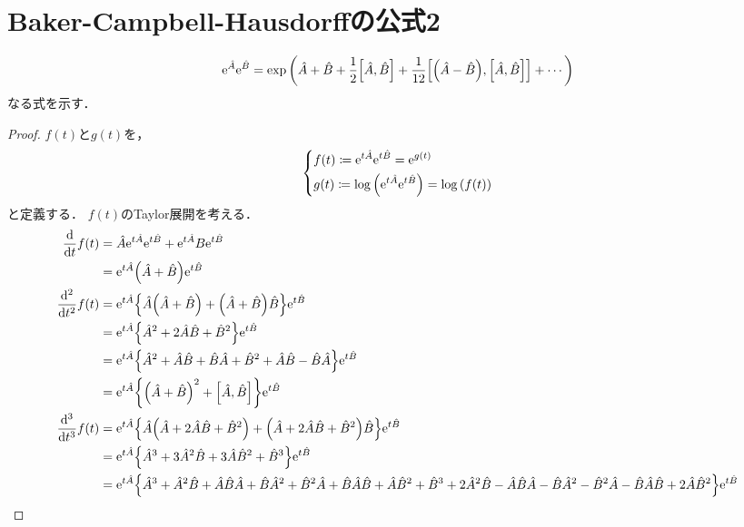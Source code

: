 \documentclass{report}
\begin{document}
  \section{Baker-Campbell-Hausdorffの公式2}
    \begin{align}
      \mathrm{e}^{\hat{A}}\mathrm{e}^{\hat{B}} = \exp\qty(\hat{A} + \hat{B} + \frac{1}{2}\qty[\hat{A}, \hat{B}] + \frac{1}{12}\qty[\qty(\hat{A} - \hat{B}), \qty[\hat{A}, \hat{B}]] + \cdots)
    \end{align}
    なる式を示す．
    \begin{proof}
      $f(t)$と$g(t)$を，
      \begin{align}
        \begin{dcases}
          f(t) \coloneqq \mathrm{e}^{t\hat{A}}\mathrm{e}^{t\hat{B}} = \mathrm{e}^{g(t)} \\ 
          g(t) \coloneqq \log\qty(\mathrm{e}^{t\hat{A}}\mathrm{e}^{t\hat{B}}) = \log\qty(f(t))
        \end{dcases}
      \end{align}
      と定義する．
      $f(t)$のTaylor展開を考える．
      \begin{align}
        \dv{t}f(t) &= \hat{A}\e^{t\hat{A}}\e^{t\hat{B}} + \e^{t\hat{A}}B\e^{t\hat{B}} \\ 
        &= \e^{t\hat{A}}\qty(\hat{A} + \hat{B})\e^{t\hat{B}} \\ 
        \dv[2]{t}f(t) &= \e^{t\hat{A}}\qty{\hat{A}\qty(\hat{A} + \hat{B}) + \qty(\hat{A} + \hat{B})\hat{B}}\e^{t\hat{B}} \\ 
        &= \e^{t\hat{A}}\qty{\hat{A}^2 + 2\hat{A}\hat{B} + \hat{B}^2}\e^{t\hat{B}} \\
        &= \e^{t\hat{A}}\qty{\hat{A}^2 + \hat{A}\hat{B} + \hat{B}\hat{A} + \hat{B}^2 + \hat{A}\hat{B} - \hat{B}\hat{A}}\e^{t\hat{B}} \\ 
        &= \e^{t\hat{A}}\qty{\qty(\hat{A} + \hat{B})^2 + \qty[\hat{A}, \hat{B}]}\e^{t\hat{B}} \\ 
        \dv[3]{t}f(t) &= \e^{t\hat{A}}\qty{\hat{A}\qty(\hat{A} + 2\hat{A}\hat{B} + \hat{B}^2) + \qty(\hat{A} + 2\hat{A}\hat{B} + \hat{B}^2)\hat{B}}\e^{t\hat{B}} \\ 
        &= \e^{t\hat{A}}\qty{\hat{A}^3 + 3\hat{A}^2\hat{B} + 3\hat{A}\hat{B}^2 + \hat{B}^3}\e^{t\hat{B}} \\ 
        &= \e^{t\hat{A}}\qty{\hat{A}^3 + \hat{A}^2\hat{B} + \hat{A}\hat{B}\hat{A} + \hat{B}\hat{A}^2 + \hat{B}^2\hat{A} + \hat{B}\hat{A}\hat{B} + \hat{A}\hat{B}^2 + \hat{B}^3 + 2\hat{A}^2\hat{B} - \hat{A}\hat{B}\hat{A} - \hat{B}\hat{A}^2 - \hat{B}^2\hat{A} - \hat{B}\hat{A}\hat{B} + 2\hat{A}\hat{B}^2}\e^{t\hat{B}} \\ 

\end{align}
\end{proof}
\end{document}
